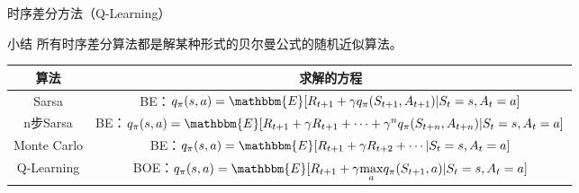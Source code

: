 \begin{section}{时序差分方法\alert{（Q-Learning）}}
\begin{frame}{小结}
    所有时序差分算法都是解某种形式的贝尔曼公式的随机近似算法。
    \begin{table}[]
        \begin{tabular}{@{}cc@{}}
        \toprule
        算法    & 求解的方程\\ \midrule
        Sarsa &  BE：$q_\pi(s,a)=\mathbbm{E}[R_{t+1}+\gamma q_\pi(S_{t+1}, A_{t+1})|S_t=s,A_t=a]$\\
        n步Sarsa & BE：$q_\pi(s,a)=\mathbbm{E}[R_{t+1}+\gamma R_{t+1}+\cdots+\gamma^n q_\pi(S_{t+n}, A_{t+n})|S_t=s,A_t=a]$ \\
        Monte Carlo &  BE：$q_\pi(s,a)=\mathbbm{E}[R_{t+1}+\gamma R_{t+2}+\cdots|S_t=s,A_t=a]$\\
        Q-Learning & \alert{BOE：$q_\pi(s,a)=\mathbbm{E}[R_{t+1}+\gamma \underset{a}{\max}q_\pi(S_{t+1}, a)|S_t=s,A_t=a]$}\\
        \bottomrule
        \end{tabular}
    \end{table}
\end{frame}

\end{section}